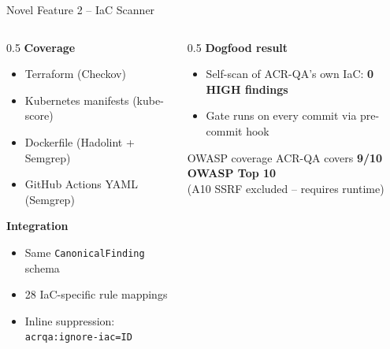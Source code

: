 \documentclass[aspectratio=169,12pt]{beamer}
\newcommand{\good}[1]{\textbf{\color{acrGreen}#1}}
\begin{document}
\begin{frame}{Novel Feature 2 -- IaC Scanner}
  \begin{columns}[T]
    \begin{column}{0.5\textwidth}
      \textbf{Coverage}
      \begin{itemize}
        \item Terraform (Checkov)
        \item Kubernetes manifests (kube-score)
        \item Dockerfile (Hadolint + Semgrep)
        \item GitHub Actions YAML (Semgrep)
      \end{itemize}
      \vspace{4pt}
      \textbf{Integration}
      \begin{itemize}
        \item Same \texttt{CanonicalFinding} schema
        \item 28 IaC-specific rule mappings
        \item Inline suppression: \texttt{acrqa:ignore-iac=ID}
      \end{itemize}
    \end{column}
    \begin{column}{0.5\textwidth}
      \textbf{Dogfood result}
      \begin{itemize}
        \item Self-scan of ACR-QA's own IaC:
              \good{0 HIGH findings}
        \item Gate runs on every commit via pre-commit hook
      \end{itemize}
      \vspace{6pt}
      \begin{block}{OWASP coverage}
        ACR-QA covers \textbf{9/10 OWASP Top 10}\\
        (A10 SSRF excluded -- requires runtime)
      \end{block}
    \end{column}
  \end{columns}
\end{frame}
\end{document}

